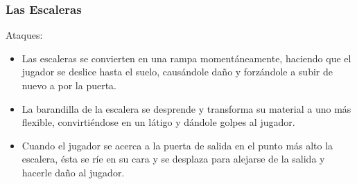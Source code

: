 \subsubsection{Las Escaleras}


Ataques:
\begin{itemize}
    \item Las escaleras se convierten en una rampa momentáneamente, haciendo que
    el jugador se deslice hasta el suelo, causándole daño y forzándole a subir
    de nuevo a por la puerta.
    \item La barandilla de la escalera se desprende y transforma su material a
    uno más flexible, convirtiéndose en un látigo y dándole golpes al jugador.
    \item Cuando el jugador se acerca a la puerta de salida en el punto más alto
    la escalera, ésta se ríe en su cara y se desplaza para alejarse de la salida
    y hacerle daño al jugador.
\end{itemize}



